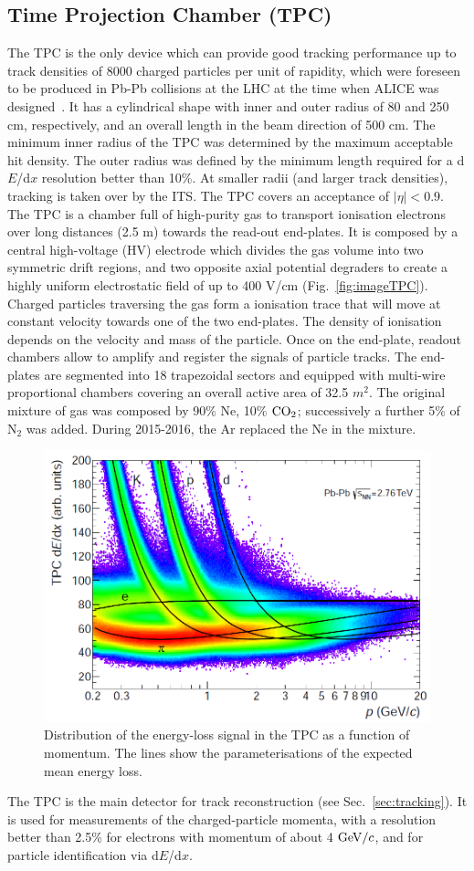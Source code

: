 \subsection{Time Projection Chamber (TPC)}
\label{sec:TPC}
The TPC is the only device which can provide good tracking
performance up to track densities of 8000 charged particles per unit of rapidity, 
which were foreseen to be produced in Pb-Pb collisions at the LHC at the time when
ALICE was designed~\cite{Dellacasa:451098}. 
It has a cylindrical shape with inner and outer radius of 80 and 250 cm, 
respectively, and an overall length in the beam direction of 500 cm. The minimum  
inner radius of the TPC was determined by the maximum acceptable hit density. 
The outer radius was defined by the minimum length required for a d$E$/d$x$ resolution 
better than 10\%. At smaller radii (and larger track densities), tracking is taken over 
by the ITS. The TPC covers an acceptance of $|\eta|<0.9$. The TPC is a chamber full of 
high-purity gas to transport ionisation electrons over long distances (2.5 m) towards the read-out end-plates. 
It is composed by a central high-voltage (HV) electrode which divides the 
gas volume into two symmetric drift regions, and two opposite axial potential degraders to
create a highly uniform electrostatic field of up to 400 V/cm (Fig.~\ref{fig:imageTPC}).
Charged particles traversing the gas form a ionisation trace that will move at constant 
velocity towards one of the two end-plates. The density of ionisation depends on the velocity and mass of the particle.
Once on the end-plate, readout chambers allow to amplify and register the signals 
of particle tracks. The end-plates are segmented into 18 trapezoidal sectors 
and equipped with multi-wire proportional chambers covering an overall active area of 32.5 $m^2$.
The original mixture of gas was composed by 90\% Ne, 10\% ${\rm CO}_2$; successively a further 5\% of N$_2$
was added. During 2015-2016, the Ar replaced the Ne in the mixture.
 \begin{figure}[!h]
\centering
\includegraphics[width=.65\textwidth]{FigCap3/TPCpid.png}
\caption{Distribution of the energy-loss signal in the TPC as a function of momentum. The lines show the parameterisations of the expected mean energy loss.}
\label{fig:imagePIDTPC}
\end{figure}
The TPC is the main detector for track reconstruction (see Sec.~\ref{sec:tracking}). 
It is used for measurements of the charged-particle 
momenta, with a resolution better than 2.5\% for electrons with momentum 
of about 4 $\mathrm{GeV}/c$, and for particle identification via d$E$/d$x$.\\


